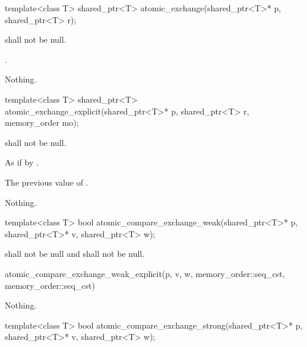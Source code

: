 %
\begin{itemdecl}
template<class T> shared_ptr<T> atomic_exchange(shared_ptr<T>* p, shared_ptr<T> r);
\end{itemdecl}

\begin{itemdescr}
\pnum
\requires {} shall not be null.

\pnum
\returns
{}.

\pnum
\throws
Nothing.
\end{itemdescr}

%
\begin{itemdecl}
template<class T>
  shared_ptr<T> atomic_exchange_explicit(shared_ptr<T>* p, shared_ptr<T> r, memory_order mo);
\end{itemdecl}

\begin{itemdescr}
\pnum
\requires {} shall not be null.

\pnum
\effects
As if by .

\pnum
\returns
The previous value of .

\pnum
\throws
Nothing.
\end{itemdescr}

%
\begin{itemdecl}
template<class T>
  bool atomic_compare_exchange_weak(shared_ptr<T>* p, shared_ptr<T>* v, shared_ptr<T> w);
\end{itemdecl}

\begin{itemdescr}
\pnum
\requires {} shall not be null and  shall not be null.

\pnum
\returns
\begin{codeblock}
atomic_compare_exchange_weak_explicit(p, v, w, memory_order::seq_cst, memory_order::seq_cst)
\end{codeblock}

\pnum
\throws
Nothing.
\end{itemdescr}

%
\begin{itemdecl}
template<class T>
  bool atomic_compare_exchange_strong(shared_ptr<T>* p, shared_ptr<T>* v, shared_ptr<T> w);
\end{itemdecl}

